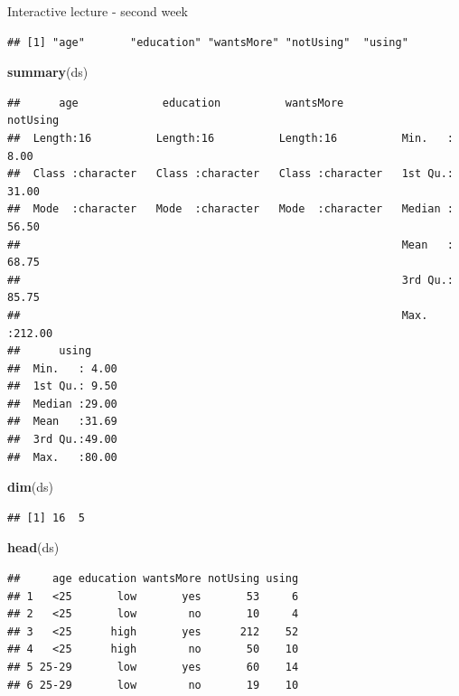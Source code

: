 \documentclass[
  ignorenonframetext,
]{beamer}
\newenvironment{Shaded}{\begin{snugshade}}{\end{snugshade}}
\newcommand{\FunctionTok}[1]{\textcolor[rgb]{0.13,0.29,0.53}{\textbf{#1}}}
\newcommand{\NormalTok}[1]{#1}
\begin{document}
\begin{frame}[fragile]{Interactive lecture - second week}
\begin{verbatim}
## [1] "age"       "education" "wantsMore" "notUsing"  "using"
\end{verbatim}

\begin{Shaded}
\begin{Highlighting}[]
\FunctionTok{summary}\NormalTok{(ds)}
\end{Highlighting}
\end{Shaded}

\begin{verbatim}
##      age             education          wantsMore            notUsing     
##  Length:16          Length:16          Length:16          Min.   :  8.00  
##  Class :character   Class :character   Class :character   1st Qu.: 31.00  
##  Mode  :character   Mode  :character   Mode  :character   Median : 56.50  
##                                                           Mean   : 68.75  
##                                                           3rd Qu.: 85.75  
##                                                           Max.   :212.00  
##      using      
##  Min.   : 4.00  
##  1st Qu.: 9.50  
##  Median :29.00  
##  Mean   :31.69  
##  3rd Qu.:49.00  
##  Max.   :80.00
\end{verbatim}

\begin{Shaded}
\begin{Highlighting}[]
\FunctionTok{dim}\NormalTok{(ds)}
\end{Highlighting}
\end{Shaded}

\begin{verbatim}
## [1] 16  5
\end{verbatim}

\begin{Shaded}
\begin{Highlighting}[]
\FunctionTok{head}\NormalTok{(ds)}
\end{Highlighting}
\end{Shaded}

\begin{verbatim}
##     age education wantsMore notUsing using
## 1   <25       low       yes       53     6
## 2   <25       low        no       10     4
## 3   <25      high       yes      212    52
## 4   <25      high        no       50    10
## 5 25-29       low       yes       60    14
## 6 25-29       low        no       19    10
\end{verbatim}


\end{frame}
\end{document}
